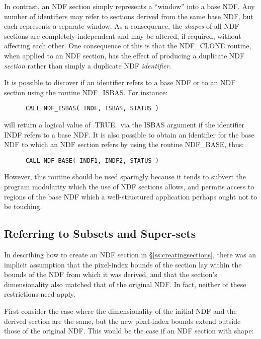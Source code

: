 \documentclass[twoside,11pt]{article}
\newcommand{\htmlref}[2]{#1}
\newcommand{\xlabel}[1]{}
\newcommand{\st}[1]{{\em{#1}}}
\begin{document}
In contrast, an NDF section simply represents a ``window'' into a base NDF. 
Any number of identifiers may refer to sections derived from the same base
NDF, but each represents a separate window.
As a consequence, the \st{shapes\/} of all NDF sections are completely
independent and may be altered, if required, without affecting each other. 
One consequence of this is that the NDF\_CLONE routine, when applied to an
NDF section, has the effect of producing a duplicate NDF \st{section\/}
rather than simply a duplicate NDF \st{identifier}. 

It is possible to discover if an identifier refers to a base NDF or to an
NDF section using the routine \htmlref{NDF\_ISBAS}{NDF_ISBAS}. 
For instance:

\small
\begin{verbatim}
      CALL NDF_ISBAS( INDF, ISBAS, STATUS )
\end{verbatim}
\normalsize

will return a logical value of .TRUE.\ via the ISBAS argument if the
identifier INDF refers to a base NDF. 
It is also possible to obtain an identifier for the base NDF to which an NDF
section refers by using the routine \htmlref{NDF\_BASE}{NDF_BASE}, thus: 

\small
\begin{verbatim}
      CALL NDF_BASE( INDF1, INDF2, STATUS )
\end{verbatim}
\normalsize

However, this routine should be used sparingly because it tends to subvert
the program modularity which the use of NDF sections allows, and permits
access to regions of the base NDF which a well-structured application perhaps
ought not to be touching. 

\subsection{\xlabel{referring_to_subsets_and_super-sets}\label{ss:selectingsupersets}Referring to Subsets and Super-sets}

In describing how to create an NDF section in \S\ref{ss:creatingsections},
there was an implicit assumption that the pixel-index bounds of the section
lay within the bounds of the NDF from which it was derived, and that the
section's dimensionality also matched that of the original NDF. 
In fact, neither of these restrictions need apply.

First consider the case where the dimensionality of the initial NDF and the
derived section are the same, but the new pixel-index bounds extend outside
those of the original NDF.
This would be the case if an NDF section with shape:
\end{document}
